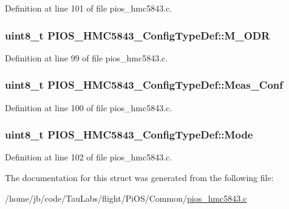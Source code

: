 \-Definition at line 101 of file pios\-\_\-hmc5843.\-c.

\hypertarget{struct_p_i_o_s___h_m_c5843___config_type_def_a29d80c591af9391d345a4f8ef883f67d}{
\subsubsection[{\-M\-\_\-\-O\-D\-R}]{\setlength{\rightskip}{0pt plus 5cm}uint8\-\_\-t {\bf \-P\-I\-O\-S\-\_\-\-H\-M\-C5843\-\_\-\-Config\-Type\-Def\-::\-M\-\_\-\-O\-D\-R}}}\label{struct_p_i_o_s___h_m_c5843___config_type_def_a29d80c591af9391d345a4f8ef883f67d}


\-Definition at line 99 of file pios\-\_\-hmc5843.\-c.

\hypertarget{struct_p_i_o_s___h_m_c5843___config_type_def_a6022f43c01ccf2eb427a5b578ed3e77f}{
\subsubsection[{\-Meas\-\_\-\-Conf}]{\setlength{\rightskip}{0pt plus 5cm}uint8\-\_\-t {\bf \-P\-I\-O\-S\-\_\-\-H\-M\-C5843\-\_\-\-Config\-Type\-Def\-::\-Meas\-\_\-\-Conf}}}\label{struct_p_i_o_s___h_m_c5843___config_type_def_a6022f43c01ccf2eb427a5b578ed3e77f}


\-Definition at line 100 of file pios\-\_\-hmc5843.\-c.

\hypertarget{struct_p_i_o_s___h_m_c5843___config_type_def_a333b4ee7245dcb0c5561f1df9fe8e1fd}{
\subsubsection[{\-Mode}]{\setlength{\rightskip}{0pt plus 5cm}uint8\-\_\-t {\bf \-P\-I\-O\-S\-\_\-\-H\-M\-C5843\-\_\-\-Config\-Type\-Def\-::\-Mode}}}\label{struct_p_i_o_s___h_m_c5843___config_type_def_a333b4ee7245dcb0c5561f1df9fe8e1fd}


\-Definition at line 102 of file pios\-\_\-hmc5843.\-c.



\-The documentation for this struct was generated from the following file\-:\begin{DoxyCompactItemize}
\item 
/home/jb/code/\-Tau\-Labs/flight/\-Pi\-O\-S/\-Common/\hyperlink{pios__hmc5843_8c}{pios\-\_\-hmc5843.\-c}\end{DoxyCompactItemize}
